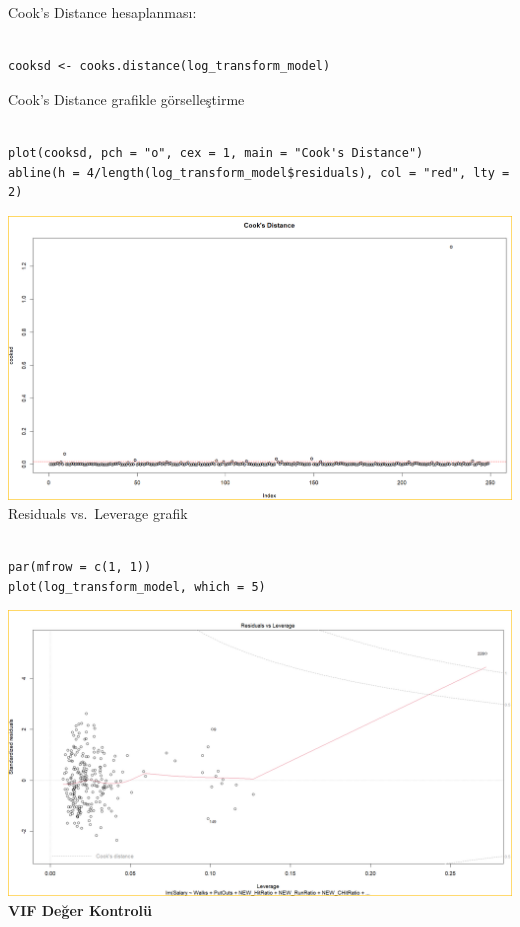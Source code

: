 \documentclass[
]{article}
\begin{document}
Cook's Distance hesaplanması:

\begin{verbatim}

cooksd <- cooks.distance(log_transform_model)
\end{verbatim}

Cook's Distance grafikle görselleştirme

\begin{verbatim}

plot(cooksd, pch = "o", cex = 1, main = "Cook's Distance")
abline(h = 4/length(log_transform_model$residuals), col = "red", lty = 2)
\end{verbatim}

\includegraphics{Picture12.png}Residuals vs.~Leverage grafik

\begin{verbatim}

par(mfrow = c(1, 1))
plot(log_transform_model, which = 5)
\end{verbatim}

\includegraphics{Picture13.png}\textbf{VIF Değer Kontrolü}
\end{document}
